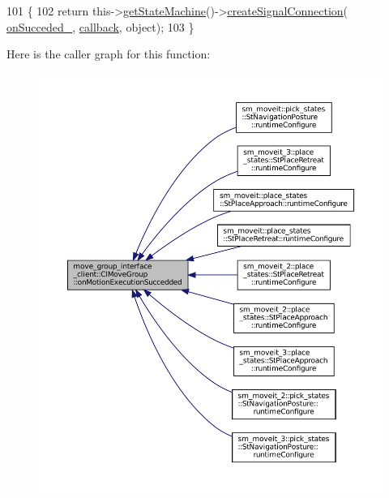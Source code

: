 \begin{DoxyCode}
101   \{
102     \textcolor{keywordflow}{return} this->\hyperlink{classsmacc_1_1ISmaccClient_aec51d4712404cb9882b86e4c854bb93a}{getStateMachine}()->\hyperlink{classsmacc_1_1ISmaccStateMachine_adf0f42ade0c65cc471960fe2a7c42da2}{createSignalConnection}(
      \hyperlink{classmove__group__interface__client_1_1ClMoveGroup_ac82aa6c44468e8035ff5df6d74746b88}{onSucceded\_}, \hyperlink{servers_2opencv__perception__node_2opencv__perception__node_8cpp_a050e697bd654facce10ea3f6549669b3}{callback}, \textcolor{keywordtype}{object});
103   \}
\end{DoxyCode}
Here is the caller graph for this function\+:
\nopagebreak
\begin{figure}[H]
\begin{center}
\leavevmode
\includegraphics[width=350pt]{classmove__group__interface__client_1_1ClMoveGroup_a04f3cafe060033b66f3fac27f744a043_icgraph}
\end{center}
\end{figure}
\mbox{\label{classmove__group__interface__client_1_1ClMoveGroup_a41c0eebdb446e6fbdd17113524c34869}} 
